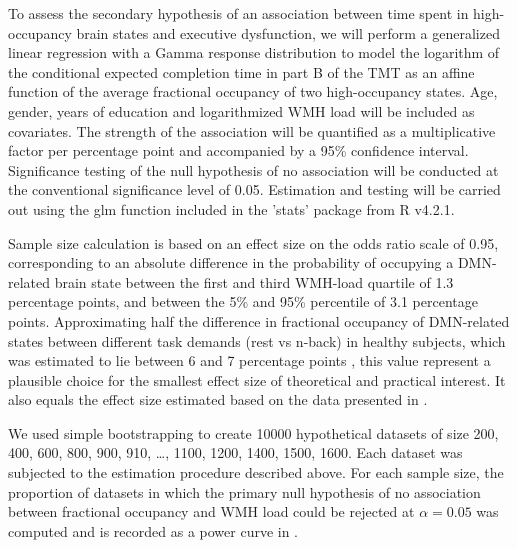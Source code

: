 To  assess the secondary hypothesis of an association between time spent in high-occupancy brain states and executive dysfunction, we will perform a generalized linear regression with a Gamma response distribution to model the logarithm of the conditional expected completion time in part B of the TMT as an affine function of the average fractional occupancy of two high-occupancy states.
Age, gender, years of education and logarithmized WMH load will be included as covariates.
The strength of the association will be quantified as a multiplicative factor per percentage point and accompanied by a 95\% confidence interval.
Significance testing of the null hypothesis of no association will be conducted at the conventional significance level of 0.05.
Estimation and testing will be carried out using the glm function included in the 'stats' package from R v4.2.1.

Sample size calculation is based on an effect size on the odds ratio scale of 0.95, corresponding to an absolute difference in the probability of occupying a DMN-related brain state between the first and third WMH-load quartile of 1.3 percentage points, and between the 5\% and 95\% percentile of 3.1 percentage points. Approximating half the difference in fractional occupancy of DMN-related states between different task demands (rest vs n-back) in healthy subjects, which was estimated to lie between 6 and 7 percentage points \citep{Cornblath2020-fu}, this value represent a plausible choice for the smallest effect size of theoretical and practical interest. It also equals the effect size estimated based on the data presented in \citep{Schlemm2022-he}. 

We used simple bootstrapping to create \num{10000} hypothetical datasets of size \num{200}, \num{400}, \num{600}, \num{800}, \num{900}, \num{910}, \ldots, \num{1100}, \num{1200}, \num{1400}, \num{1500}, \num{1600}.
Each dataset was subjected to the estimation procedure described above.
For each sample size, the proportion of datasets in which the primary null hypothesis of no association between fractional occupancy and WMH load could be rejected at $\alpha=0.05$ was computed and is recorded as a power curve in .

